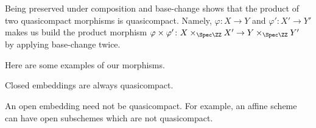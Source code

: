 \documentclass[../notes.tex]{subfiles}
\begin{document}
\begin{remark}
	Being preserved under composition and base-change shows that the product of two quasicompact morphisms is quasicompact. Namely, $\varphi\colon X\to Y$ and $\varphi'\colon X'\to Y'$ makes us build the product morphism $\varphi\times\varphi'\colon X\times_{\Spec\ZZ}X'\to Y\times_{\Spec\ZZ}Y'$ by applying base-change twice.
\end{remark}
Here are some examples of our morphisms.
\begin{example}
	Closed embeddings are always quasicompact.
\end{example}
\begin{nex}
	An open embedding need not be quasicompact. For example, an affine scheme can have open subschemes which are not quasicompact.
\end{nex}
\end{document}
